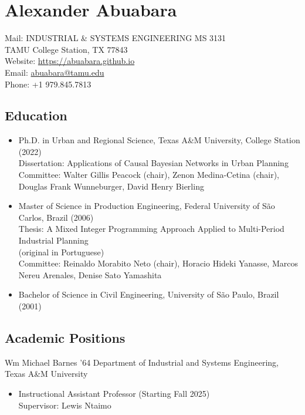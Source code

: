 \documentclass[11pt,oneside]{article}
\begin{document}
\pagestyle{firstpage}
\raggedright

\section*{Alexander Abuabara}
Mail: INDUSTRIAL \& SYSTEMS ENGINEERING MS 3131\\
\hspace{0.9cm} TAMU College Station, TX 77843\\[1pt]
Website: \url{https://abuabara.github.io}\\[1pt]
Email: \href{abuabara@tamu.edu}{abuabara@tamu.edu}\\[1pt]
Phone: +1 979.845.7813

\subsection*{Education}
\begin{itemize}[leftmargin=20pt]
\item Ph.D. in Urban and Regional Science, Texas A\&M University, College Station (2022)\\[1pt]
      Dissertation: Applications of Causal Bayesian Networks in Urban Planning\\[1pt]
      Committee: Walter Gillis Peacock (chair), Zenon Medina-Cetina (chair), Douglas Frank Wunneburger, David Henry Bierling
\item Master of Science in Production Engineering, Federal University of São Carlos, Brazil (2006)\\[1pt]
      Thesis: A Mixed Integer Programming Approach Applied to Multi-Period Industrial Planning\\[-1pt]
      {\small (original in Portuguese)}\\[1pt]
      Committee: Reinaldo Morabito Neto (chair), Horacio Hideki Yanasse, Marcos Nereu Arenales, Denise Sato Yamashita
\item Bachelor of Science in Civil Engineering, University of São Paulo, Brazil (2001)
\end{itemize}

\subsection*{Academic Positions}
{Wm Michael Barnes ’64 Department of Industrial and Systems Engineering, Texas A\&M University}
\begin{itemize}[leftmargin=20pt]
\item Instructional Assistant Professor (Starting Fall 2025)\\
      Supervisor: Lewis Ntaimo
\end{itemize}
\end{document}
